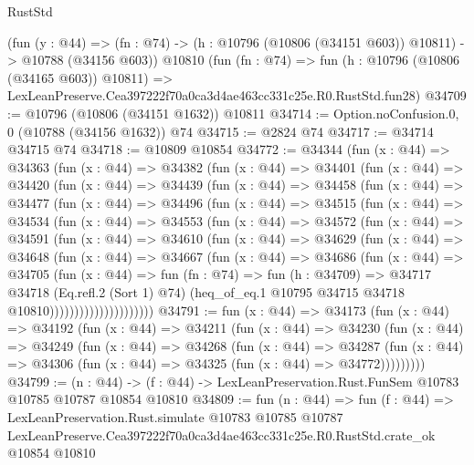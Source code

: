 \begin{lexlean}{RustStd}
\begin{coremodule}
    (fun (y : @44) =>
    (fn : @74) -> (h : @10796 (@10806 (@34151 @603)) @10811) -> @10788 (@34156 @603))
    @10810
    (fun (fn : @74) =>
    fun (h : @10796 (@10806 (@34165 @603)) @10811) =>
    LexLeanPreserve.Cea397222f70a0ca3d4ae463cc331c25e.R0.RustStd.fun28)
@34709 := @10796 (@10806 (@34151 @1632)) @10811
@34714 := Option.noConfusion.{0, 0} (@10788 (@34156 @1632)) @74
@34715 := @2824 @74
@34717 := @34714 @34715 @74
@34718 := @10809 @10854
@34772 := @34344
    (fun (x : @44) =>
    @34363
      (fun (x : @44) =>
      @34382
        (fun (x : @44) =>
        @34401
          (fun (x : @44) =>
          @34420
            (fun (x : @44) =>
            @34439
              (fun (x : @44) =>
              @34458
                (fun (x : @44) =>
                @34477
                  (fun (x : @44) =>
                  @34496
                    (fun (x : @44) =>
                    @34515
                      (fun (x : @44) =>
                      @34534
                        (fun (x : @44) =>
                        @34553
                          (fun (x : @44) =>
                          @34572
                            (fun (x : @44) =>
                            @34591
                              (fun (x : @44) =>
                              @34610
                                (fun (x : @44) =>
                                @34629
                                  (fun (x : @44) =>
                                  @34648
                                    (fun (x : @44) =>
                                    @34667
                                      (fun (x : @44) =>
                                      @34686
                                        (fun (x : @44) =>
                                        @34705
                                          (fun (x : @44) =>
                                          fun (fn : @74) =>
                                          fun (h : @34709) =>
                                          @34717
                                            @34718
                                            (Eq.refl.{2} (Sort 1) @74)
                                            (heq_of_eq.{1}
                                              @10795
                                              @34715
                                              @34718
                                              @10810)))))))))))))))))))))
@34791 := fun (x : @44) =>
  @34173
    (fun (x : @44) =>
    @34192
      (fun (x : @44) =>
      @34211
        (fun (x : @44) =>
        @34230
          (fun (x : @44) =>
          @34249
            (fun (x : @44) =>
            @34268
              (fun (x : @44) =>
              @34287
                (fun (x : @44) => @34306 (fun (x : @44) => @34325 (fun (x : @44) => @34772)))))))))
@34799 := (n : @44) ->
  (f : @44) -> LexLeanPreservation.Rust.FunSem @10783 @10785 @10787 @10854 @10810
@34809 := fun (n : @44) =>
  fun (f : @44) =>
  LexLeanPreservation.Rust.simulate
    @10783
    @10785
    @10787
    LexLeanPreserve.Cea397222f70a0ca3d4ae463cc331c25e.R0.RustStd.crate_ok
    @10854
    @10810
\end{coremodule}
\end{lexlean}
